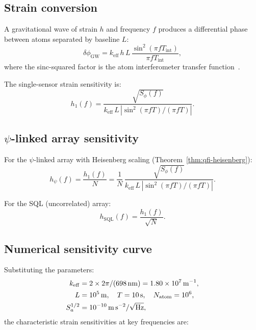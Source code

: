 \documentclass[aps,prl,twocolumn,superscriptaddress,showpacs]{revtex4-2}
\theoremstyle{definition}
\newcommand{\SQL}{\mathrm{SQL}}
\begin{document}
\subsection{Strain conversion}

A gravitational wave of strain $h$ and frequency $f$ produces a
differential phase between atoms separated by baseline $L$:
\begin{equation}
\delta\phi_{\mathrm{GW}} = k_{\mathrm{eff}}\,h\,L\,
\frac{\sin^2(\pi f T_{\mathrm{int}})}{\pi f T_{\mathrm{int}}},
\label{eq:gw-phase-response}
\end{equation}
where the sinc-squared factor is the atom interferometer transfer
function~\cite{Graham2013,Dimopoulos2008}.

The single-sensor strain sensitivity is:
\begin{equation}
h_1(f) = \frac{\sqrt{S_\phi(f)}}{k_{\mathrm{eff}}\,L\,
|\sin^2(\pi f T)/(\pi f T)|}.
\label{eq:single-strain}
\end{equation}

\subsection{$\psi$-linked array sensitivity}

For the $\psi$-linked array with Heisenberg scaling (Theorem~\ref{thm:qfi-heisenberg}):
\begin{equation}
\boxed{h_\psi(f) = \frac{h_1(f)}{N} = \frac{1}{N}\,
\frac{\sqrt{S_\phi(f)}}{k_{\mathrm{eff}}\,L\,
|\sin^2(\pi f T)/(\pi f T)|}}.
\label{eq:psi-linked-strain}
\end{equation}

For the SQL (uncorrelated) array:
\begin{equation}
h_{\SQL}(f) = \frac{h_1(f)}{\sqrt{N}}.
\label{eq:sql-strain}
\end{equation}

\subsection{Numerical sensitivity curve}

Substituting the parameters:
\begin{align}
k_{\mathrm{eff}} &= 2\times 2\pi/(698\,\mathrm{nm})
= 1.80\times 10^7\,\mathrm{m^{-1}}, \notag\\
L &= 10^5\,\mathrm{m}, \quad T = 10\,\mathrm{s}, \quad
N_{\mathrm{atom}} = 10^6, \notag\\
S_a^{1/2} &= 10^{-10}\,\mathrm{m\,s^{-2}/\sqrt{Hz}},
\label{eq:parameters}
\end{align}
the characteristic strain sensitivities at key frequencies are:
\end{document}
